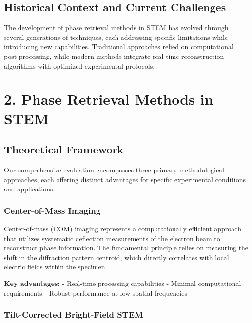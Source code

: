 \documentclass[
  letterpaper,
]{article}
\begin{document}
\section{Historical Context and Current
Challenges}\label{historical-context-and-current-challenges}

The development of phase retrieval methods in STEM has evolved through
several generations of techniques, each addressing specific limitations
while introducing new capabilities. Traditional approaches relied on
computational post-processing, while modern methods integrate real-time
reconstruction algorithms with optimized experimental protocols.


\chapter{2. Phase Retrieval Methods in
STEM}\label{phase-retrieval-methods-in-stem}

\section{Theoretical Framework}\label{theoretical-framework}

Our comprehensive evaluation encompasses three primary methodological
approaches, each offering distinct advantages for specific experimental
conditions and applications.

\subsection{Center-of-Mass Imaging}\label{center-of-mass-imaging}

Center-of-mass (COM) imaging represents a computationally efficient
approach that utilizes systematic deflection measurements of the
electron beam to reconstruct phase information. The fundamental
principle relies on measuring the shift in the diffraction pattern
centroid, which directly correlates with local electric fields within
the specimen.

\textbf{Key advantages:} - Real-time processing capabilities - Minimal
computational requirements - Robust performance at low spatial
frequencies

\subsection{Tilt-Corrected Bright-Field
STEM}\label{tilt-corrected-bright-field-stem}
\end{document}
